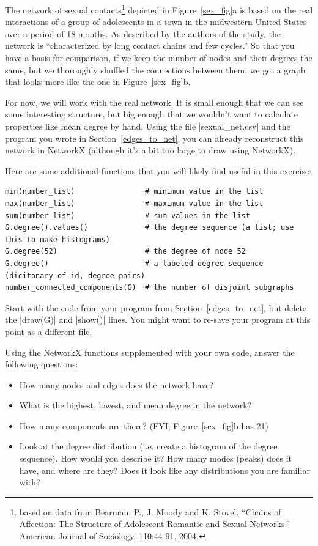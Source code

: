 \documentclass{article}
\begin{document}
The network of sexual contacts\footnote{based on data from Bearman, P., J. Moody and K. Stovel. ``Chains of Affection: The 
Structure of Adolescent Romantic and Sexual Networks.'' American Journal of Sociology. 110:44-91, 2004.} depicted in Figure~\ref{sex_fig}a is based on the real interactions of a 
group of adolescents in a town in the midwestern United States over a period of 18 months.  As described by the authors of the study, the network is
``characterized by long contact chains and few cycles.''  So that you have a basis for comparison, if we keep the number of nodes and their degrees the same,
but we thoroughly shuffled the connections between them, we get a graph that looks more like the one in Figure~\ref{sex_fig}b.

For now, we will work with the real network.  It is small enough that we can see some 
interesting structure, but big enough that we wouldn't want to calculate properties like mean degree by hand. 
 Using the file |sexual_net.csv| and the program you wrote in Section~\ref{edges_to_net}, you can already reconstruct this network 
in NetworkX (although it's a bit too large to draw using NetworkX).

Here are some additional functions that you will likely find useful in this exercise:
\begin{Verbatim}[samepage=true]
min(number_list)                # minimum value in the list
max(number_list)                # maximum value in the list
sum(number_list)                # sum values in the list
G.degree().values()             # the degree sequence (a list; use this to make histograms)
G.degree(52)                    # the degree of node 52
G.degree()                      # a labeled degree sequence (dicitonary of id, degree pairs)
number_connected_components(G)  # the number of disjoint subgraphs
\end{Verbatim}

Start with the code from your program from Section~\ref{edges_to_net}, but delete the |draw(G)| and |show()| lines.  You might want to re-save your 
program at this point as a different file.

Using the NetworkX functions supplemented with your own code, answer the following questions:
\begin{itemize}
 \item How many nodes and edges does the network have?
 \item What is the highest, lowest, and mean degree in the network?
 \item How many components are there?  (FYI, Figure~\ref{sex_fig}b has 21)
 \item Look at the degree distribution (i.e. create a histogram of the degree sequence).  How would you describe it?  How many modes (peaks) 
does it have, and where are they?  Does it look like any distributions you are familiar with?
\end{itemize}
\end{document}
